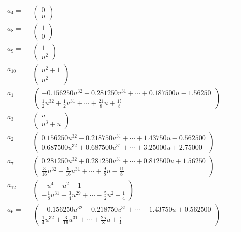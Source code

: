 \documentclass[1p]{elsarticle_modified}
\theoremstyle{definition}
\begin{document}
\begin{tabular}{m{7pt} m{180pt} m{7pt} m{180pt} }
\flushright $a_{4}=$&$\begin{pmatrix}0\\u\end{pmatrix}$ \\
\flushright $a_{8}=$&$\begin{pmatrix}1\\0\end{pmatrix}$ \\
\flushright $a_{9}=$&$\begin{pmatrix}1\\u^2\end{pmatrix}$ \\
\flushright $a_{10}=$&$\begin{pmatrix}u^2+1\\u^2\end{pmatrix}$ \\
\flushright $a_{1}=$&$\begin{pmatrix}-0.156250 u^{32}-0.281250 u^{31}+\cdots+0.187500 u-1.56250\\\frac{1}{2} u^{32}+\frac{1}{2} u^{31}+\cdots+\frac{21}{8} u+\frac{15}{8}\end{pmatrix}$ \\
\flushright $a_{3}=$&$\begin{pmatrix}u\\u^3+u\end{pmatrix}$ \\
\flushright $a_{2}=$&$\begin{pmatrix}0.156250 u^{32}-0.218750 u^{31}+\cdots+1.43750 u-0.562500\\0.687500 u^{32}+0.687500 u^{31}+\cdots+3.25000 u+2.75000\end{pmatrix}$ \\
\flushright $a_{7}=$&$\begin{pmatrix}0.281250 u^{32}+0.281250 u^{31}+\cdots+0.812500 u+1.56250\\\frac{3}{16} u^{32}-\frac{9}{16} u^{31}+\cdots+\frac{9}{8} u-\frac{11}{8}\end{pmatrix}$ \\
\flushright $a_{12}=$&$\begin{pmatrix}- u^4- u^2-1\\-\frac{1}{8} u^{31}-\frac{3}{4} u^{29}+\cdots-\frac{5}{2} u^2-\frac{1}{4}\end{pmatrix}$ \\
\flushright $a_{6}=$&$\begin{pmatrix}-0.156250 u^{32}+0.218750 u^{31}+\cdots-1.43750 u+0.562500\\\frac{1}{4} u^{32}+\frac{3}{16} u^{31}+\cdots+\frac{25}{8} u+\frac{5}{4}\end{pmatrix}$ \\

\end{tabular}
\end{document}
